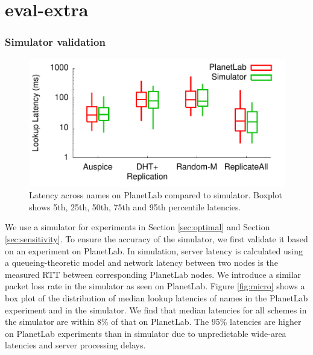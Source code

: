 \section{eval-extra}



\subsubsection{Simulator validation}
\label{sec:validation}

\begin{figure}[h]
\centering
\includegraphics[scale=0.5]{graph/simulatorval1.pdf}
\vspace{-0.1in}
\caption{Latency across names on PlanetLab compared to simulator. Boxplot shows 5th, 25th, 50th, 75th and 95th percentile latencies.}
\vspace{-0.1in}
\label{fig:simulatorval}
\end{figure}

We use a simulator for experiments in Section \ref{sec:optimal} and Section \ref{sec:sensitivity}.  To ensure the accuracy of the simulator, we first validate it based on an experiment on PlanetLab. 
In simulation,  server latency is calculated using  a queueing-theoretic model \cite{mm1} and network latency between two nodes is the measured RTT between corresponding PlanetLab nodes.  
We introduce a similar packet loss rate in the simulator as seen on PlanetLab. 
Figure \ref{fig:micro} shows a box plot of the distribution of median lookup latencies of names  in the PlanetLab experiment and in the simulator. We find that median latencies for all schemes in the simulator are within 8\% of that on PlanetLab. The 95\% latencies are higher on PlanetLab experiments than in simulator due to unpredictable wide-area latencies and server processing delays. 






